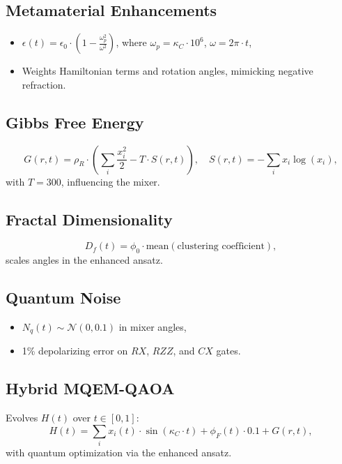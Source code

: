 \documentclass{article}
\theoremstyle{plain}
\begin{document}
\subsection{Metamaterial Enhancements}
\begin{itemize}
    \item \( \epsilon(t) = \epsilon_0 \cdot \left(1 - \frac{\omega_p^2}{\omega^2}\right) \), where \(\omega_p = \kappa_C \cdot 10^6\), \(\omega = 2\pi \cdot t\),
    \item Weights Hamiltonian terms and rotation angles, mimicking negative refraction.
\end{itemize}

\subsection{Gibbs Free Energy}
\begin{equation}
G(r,t) = \rho_R \cdot \left( \sum_i \frac{x_i^2}{2} - T \cdot S(r,t) \right), \quad S(r,t) = -\sum_i x_i \log(x_i),
\end{equation}
with \( T = 300 \), influencing the mixer.

\subsection{Fractal Dimensionality}
\begin{equation}
D_f(t) = \phi_0 \cdot \text{mean}(\text{clustering coefficient}),
\end{equation}
scales angles in the enhanced ansatz.

\subsection{Quantum Noise}
\begin{itemize}
    \item \( N_q(t) \sim \mathcal{N}(0, 0.1) \) in mixer angles,
    \item 1\% depolarizing error on \( RX \), \( RZZ \), and \( CX \) gates.
\end{itemize}

\subsection{Hybrid MQEM-QAOA}
Evolves \( H(t) \) over \( t \in [0,1] \):
\begin{equation}
H(t) = \sum_i x_i(t) \cdot \sin(\kappa_C \cdot t) + \phi_F(t) \cdot 0.1 + G(r,t),
\end{equation}
with quantum optimization via the enhanced ansatz.
\end{document}
